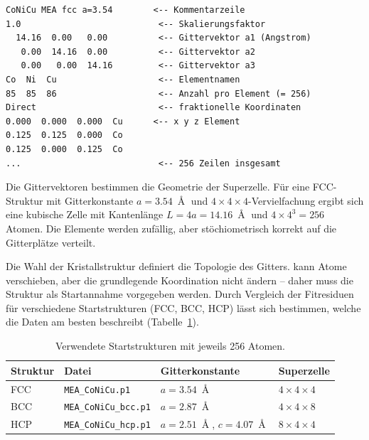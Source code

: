 \begin{lstlisting}[caption={Aufbau einer POSCAR-Datei
  (\texttt{MEA\_CoNiCu.p1}).}, label=lst:poscar]
CoNiCu MEA fcc a=3.54        <-- Kommentarzeile
1.0                           <-- Skalierungsfaktor
  14.16  0.00   0.00          <-- Gittervektor a1 (Angstrom)
   0.00  14.16  0.00          <-- Gittervektor a2
   0.00   0.00  14.16         <-- Gittervektor a3
Co  Ni  Cu                    <-- Elementnamen
85  85  86                    <-- Anzahl pro Element (= 256)
Direct                        <-- fraktionelle Koordinaten
0.000  0.000  0.000  Cu      <-- x y z Element
0.125  0.125  0.000  Co
0.125  0.000  0.125  Co
...                           <-- 256 Zeilen insgesamt
\end{lstlisting}

Die Gittervektoren bestimmen die Geometrie der Superzelle.
Für eine FCC-Struktur mit Gitterkonstante $a = \SI{3.54}{\Angstrom}$
und $4\times4\times4$-Vervielfachung ergibt sich eine kubische Zelle
mit Kantenlänge $L = 4a = \SI{14.16}{\Angstrom}$ und
$4 \times 4^3 = 256$ Atomen.
Die Elemente werden zufällig, aber stöchiometrisch korrekt auf die
Gitterplätze verteilt.

Die Wahl der Kristallstruktur definiert die Topologie des Gitters.
\evax{} kann Atome verschieben, aber die grundlegende Koordination
nicht ändern -- daher muss die Struktur als Startannahme vorgegeben
werden.
Durch Vergleich der Fitresiduen für verschiedene Startstrukturen
(FCC, BCC, HCP) lässt sich bestimmen, welche die Daten am besten
beschreibt (Tabelle~\ref{tab:startstrukturen-anhang}).

\begin{table}[htbp]
  \centering
  \caption{Verwendete Startstrukturen mit jeweils 256 Atomen.}
  \label{tab:startstrukturen-anhang}
  \small
  \begin{tabular}{llll}
    \toprule
    \textbf{Struktur} & \textbf{Datei} &
    \textbf{Gitterkonstante} & \textbf{Superzelle} \\
    \midrule
    FCC & \texttt{MEA\_CoNiCu.p1}
        & $a = \SI{3.54}{\Angstrom}$
        & $4\times4\times4$ \\
    BCC & \texttt{MEA\_CoNiCu\_bcc.p1}
        & $a = \SI{2.87}{\Angstrom}$
        & $4\times4\times8$ \\
    HCP & \texttt{MEA\_CoNiCu\_hcp.p1}
        & $a = \SI{2.51}{\Angstrom}$, $c = \SI{4.07}{\Angstrom}$
        & $8\times4\times4$ \\
    \bottomrule
  \end{tabular}
\end{table}


